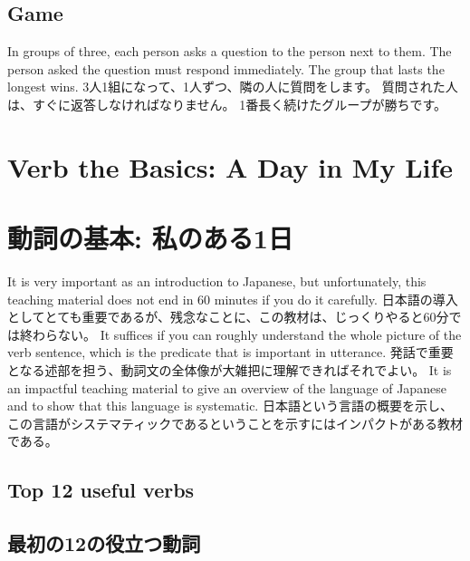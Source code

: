 \documentclass[uplatex,dvipdfmx,b5paper,english,10pt]{jsbook}
\begin{document}
\subsection{Game}

\ifEnglish
In groups of three, each person asks a question to the person next to them.
The person asked the question must respond immediately.
The group that lasts the longest wins.
\else 
3人1組になって、1人ずつ、隣の人に質問をします。
質問された人は、すぐに返答しなければなりません。
1番長く続けたグループが勝ちです。
\fi

\ifEnglish
\section{Verb the Basics: A Day in My Life}
\else
\section{動詞の基本: 私のある1日}
\fi


\ifEnglish
It is very important as an introduction to Japanese, but unfortunately, this teaching material does not end in 60 minutes if you do it carefully.
\else
日本語の導入としてとても重要であるが、残念なことに、この教材は、じっくりやると60分では終わらない。
\fi
\ifEnglish
It suffices if you can roughly understand the whole picture of the verb sentence, which is the predicate that is important in utterance.
\else
発話で重要となる述部を担う、動詞文の全体像が大雑把に理解できればそれでよい。
\fi
\ifEnglish
It is an impactful teaching material to give an overview of the language of Japanese and to show that this language is systematic.
\else
日本語という言語の概要を示し、この言語がシステマティックであるということを示すにはインパクトがある教材である。
\fi

\ifEnglish
\subsection{Top 12 useful verbs}
\else
\subsection{最初の12の役立つ動詞}
\fi
\end{document}
